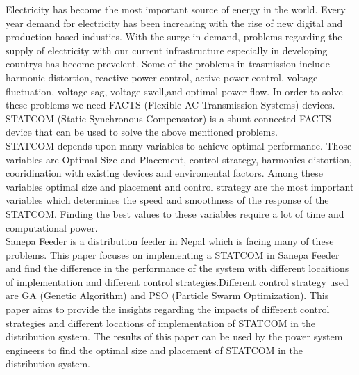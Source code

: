 Electricity has become the most important source of energy in the world. Every year demand for electricity has been increasing with the rise of new digital and production based industies. With the surge in demand, problems regarding the supply of electricity with our current infrastructure especially in developing countrys has become prevelent. Some of the problems in trasmission include harmonic distortion, reactive power control, active power control, voltage fluctuation, voltage sag, voltage swell,and optimal power flow\cite{sharma2023comprehensive}. In order to solve these problems we need FACTS (Flexible AC Transmission Systems) devices. STATCOM (Static Synchronous Compensator) is a shunt connected FACTS device that can be used to solve the above mentioned problems.\\
STATCOM depends upon many variables to achieve optimal performance. Those variables are Optimal Size and Placement, control strategy, harmonics distortion, cooridination with existing devices and enviromental factors. Among these variables optimal size and placement and control strategy are the most important variables which determines the speed and smoothness of the response of the STATCOM. Finding the best values to these variables require a lot of time and computational power.\\
Sanepa Feeder is a distribution feeder in Nepal which is facing many of these problems. This paper focuses on implementing a STATCOM in Sanepa Feeder and find the difference in the performance of the system with different locaitions of implementation and different control strategies.Different control strategy used are GA (Genetic Algorithm) and PSO (Particle Swarm Optimization). This paper aims to provide the insights regarding the impacts of different control strategies and different locations of implementation of STATCOM in the distribution system. The results of this paper can be used by the power system engineers to find the optimal size and placement of STATCOM in the distribution system.\\